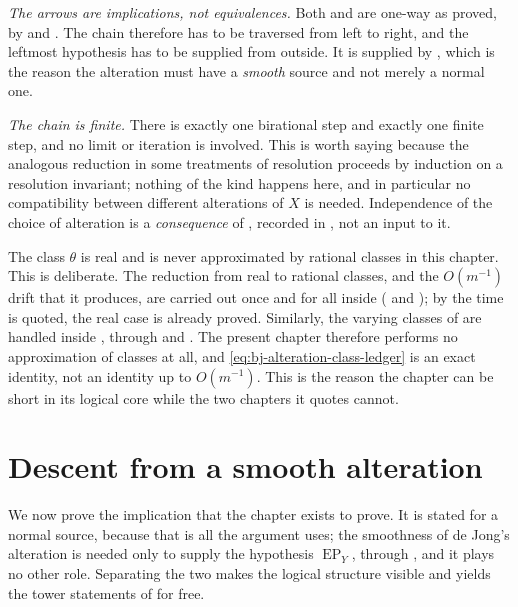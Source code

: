 \emph{The arrows are implications, not equivalences.}  Both
 and
 are one-way as proved, by
 and .  The chain therefore
has to be traversed from left to right, and the leftmost hypothesis has to
be supplied from outside.  It is supplied by
, which is the reason the alteration must have
a \emph{smooth} source and not merely a normal one.

\emph{The chain is finite.}  There is exactly one birational step and
exactly one finite step, and no limit or iteration is involved.  This is
worth saying because the analogous reduction in some treatments of
resolution proceeds by induction on a resolution invariant; nothing of the
kind happens here, and in particular no compatibility between different
alterations of $X$ is needed.  Independence of the choice of alteration is
a \emph{consequence} of , recorded in
, not an input to it.

\begin{remark}
\label{rem:ch42-real-classes}
The class $\theta$ is real and is never approximated by rational classes
in this chapter.  This is deliberate.  The reduction from real to rational
classes, and the $O(m^{-1})$ drift that it produces, are carried out once
and for all inside 
( and ); by the
time  is quoted, the real case is already
proved.  Similarly, the varying classes of  are handled
inside , through
 and
.  The present chapter therefore performs no
approximation of classes at all, and \eqref{eq:bj-alteration-class-ledger} is
an exact identity, not an identity up to $O(m^{-1})$.  This is the reason
the chapter can be short in its logical core while the two chapters it
quotes cannot.
\end{remark}

\section{Descent from a smooth alteration}
\label{sec:ch42-descent}

We now prove the implication that the chapter exists to prove.  It is
stated for a normal source, because that is all the argument uses; the
smoothness of de Jong's alteration is needed only to supply the hypothesis
$\operatorname{EP}_Y$, through , and it plays
no other role.  Separating the two makes the logical structure visible and
yields the tower statements of  for
free.

